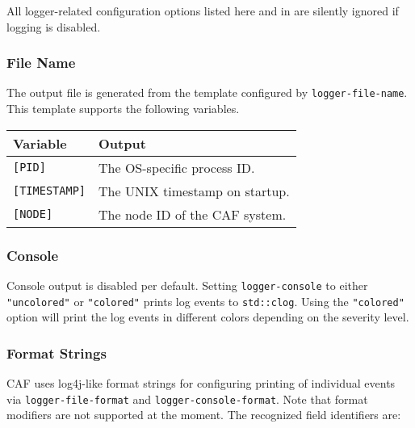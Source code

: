All logger-related configuration options listed here and in
 are silently ignored if logging is disabled.

\subsubsection{File Name}
\label{log-output-file-name}

The output file is generated from the template configured by
\lstinline^logger-file-name^. This template supports the following variables.

\begin{tabular}{|p{}|p{}|}
  \hline
  \textbf{Variable} & \textbf{Output} \\
  \hline
  \texttt{[PID]} & The OS-specific process ID. \\
  \hline
  \texttt{[TIMESTAMP]} & The UNIX timestamp on startup. \\
  \hline
  \texttt{[NODE]} & The node ID of the CAF system. \\
  \hline
\end{tabular}

\subsubsection{Console}
\label{log-output-console}

Console output is disabled per default. Setting \lstinline^logger-console^ to
either \lstinline^"uncolored"^ or \lstinline^"colored"^ prints log events to
\lstinline^std::clog^. Using the \lstinline^"colored"^ option will print the
log events in different colors depending on the severity level.

\subsubsection{Format Strings}
\label{log-output-format-strings}

CAF uses log4j-like format strings for configuring printing of individual
events via \lstinline^logger-file-format^ and
\lstinline^logger-console-format^. Note that format modifiers are not supported
at the moment. The recognized field identifiers are:

